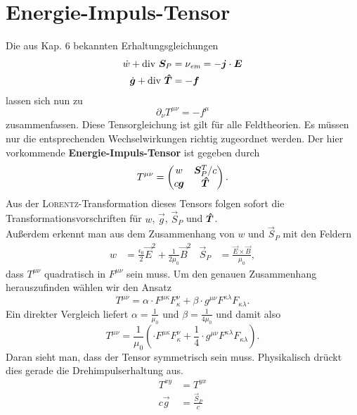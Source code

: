 \section{Energie-Impuls-Tensor}

Die aus Kap. 6 bekannten Erhaltungsgleichungen
\begin{align*}
\dot{w}+\text{div }\bm{S}_P &= \nu_\textit{em} = -\bm{j}\cdot\bm{E}\\
\dot{\bm{g}} + \text{div }\bm{\hat{T}} &= -\bm{f}
\end{align*} 
lassen sich nun zu
\begin{equation*}
\partial_\nu T^{\mu\nu}= -f^\mu
\end{equation*}
zusammenfassen. Diese Tensorgleichung ist gilt für alle Feldtheorien. Es müssen nur die entsprechenden Wechselwirkungen richtig zugeordnet werden. Der hier vorkommende \textbf{Energie-Impuls-Tensor} ist gegeben durch
\begin{equation*}
T^{\mu\nu} = \begin{pmatrix}
w & \bm{S}_P^T/c\\
c\bm{g} & \bm{\hat{T}}
\end{pmatrix}.
\end{equation*}
Aus der \textsc{Lorentz}-Transformation dieses Tensors folgen sofort die Transformationsvorschriften für $w$, $\vec{g}$, $\vec{S}_P$ und $\bm{\hat{T}}$.\\
Außerdem erkennt man aus dem Zusammenhang von $w$ und $\vec{S}_P$ mit den Feldern
\begin{align*}
w &= \frac{\epsilon_0}{2}\vec{E}^2 + \frac{1}{2\mu_0}\vec{B}^2 &\vec{S}_P &=\frac{\vec{E}\times\vec{B}}{\mu_0}, 
\end{align*}
dass $T^{\mu\nu}$ quadratisch in $F^{\mu\nu}$ sein muss. Um den genauen Zusammenhang herauszufinden wählen wir den Ansatz
\begin{equation*}
T^{\mu\nu} = \alpha\cdot F^{\mu\kappa} F_\kappa^\nu + \beta\cdot g^{\mu\nu} F^{\kappa\lambda} F_{\kappa\lambda}.
\end{equation*}
Ein direkter Vergleich liefert $\alpha = \frac{1}{\mu_0}$ und $\beta = \frac{1}{4\mu_0}$ und damit also
\begin{equation*}
T^{\mu\nu} = \frac{1}{\mu_0}\left(\cdot F^{\mu\kappa} F_\kappa^\nu + \frac{1}{4}\cdot g^{\mu\nu} F^{\kappa\lambda} F_{\kappa\lambda}\right).
\end{equation*}
Daran sieht man, dass der Tensor symmetrisch sein muss. Physikalisch drückt dies gerade die Drehimpulserhaltung aus.
\begin{align*}
T^{xy}&=T^{yx}\\
c\vec{g} & =\frac{\vec{S}_P}{c}
\end{align*}

